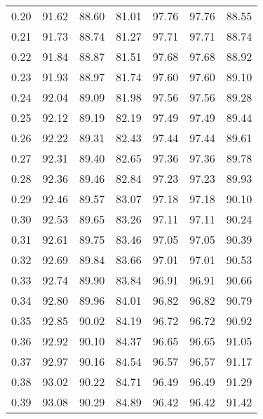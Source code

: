 \begin{tabular}{|c|c|c|c|c|c|c|}
      0.20 &     91.62 &     88.60 &      81.01 &   97.76 &      97.76 &         88.55 \\
      0.21 &     91.73 &     88.74 &      81.27 &   97.71 &      97.71 &         88.74 \\
      0.22 &     91.84 &     88.87 &      81.51 &   97.68 &      97.68 &         88.92 \\
      0.23 &     91.93 &     88.97 &      81.74 &   97.60 &      97.60 &         89.10 \\
      0.24 &     92.04 &     89.09 &      81.98 &   97.56 &      97.56 &         89.28 \\
      0.25 &     92.12 &     89.19 &      82.19 &   97.49 &      97.49 &         89.44 \\
      0.26 &     92.22 &     89.31 &      82.43 &   97.44 &      97.44 &         89.61 \\
      0.27 &     92.31 &     89.40 &      82.65 &   97.36 &      97.36 &         89.78 \\
      0.28 &     92.36 &     89.46 &      82.84 &   97.23 &      97.23 &         89.93 \\
      0.29 &     92.46 &     89.57 &      83.07 &   97.18 &      97.18 &         90.10 \\
      0.30 &     92.53 &     89.65 &      83.26 &   97.11 &      97.11 &         90.24 \\
      0.31 &     92.61 &     89.75 &      83.46 &   97.05 &      97.05 &         90.39 \\
      0.32 &     92.69 &     89.84 &      83.66 &   97.01 &      97.01 &         90.53 \\
      0.33 &     92.74 &     89.90 &      83.84 &   96.91 &      96.91 &         90.66 \\
      0.34 &     92.80 &     89.96 &      84.01 &   96.82 &      96.82 &         90.79 \\
      0.35 &     92.85 &     90.02 &      84.19 &   96.72 &      96.72 &         90.92 \\
      0.36 &     92.92 &     90.10 &      84.37 &   96.65 &      96.65 &         91.05 \\
      0.37 &     92.97 &     90.16 &      84.54 &   96.57 &      96.57 &         91.17 \\
      0.38 &     93.02 &     90.22 &      84.71 &   96.49 &      96.49 &         91.29 \\
      0.39 &     93.08 &     90.29 &      84.89 &   96.42 &      96.42 &         91.42 \\

\end{tabular}
